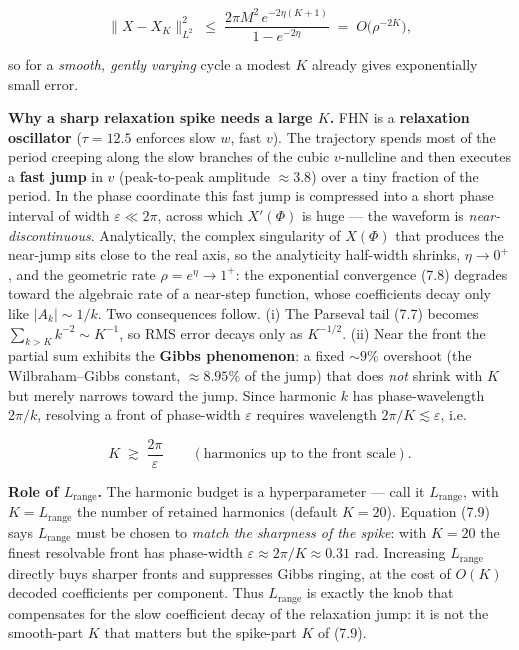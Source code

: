 \documentclass[
  11pt,
]{article}
\providecommand{\gt}{>}
\begin{document}
\[
\|X-X_K\|_{L^2}^2\;\le\;\frac{2\pi M^2\,e^{-2\eta(K+1)}}{1-e^{-2\eta}}\;=\;O\!\big(\rho^{-2K}\big), \tag{7.8}
\]

so for a \emph{smooth, gently varying} cycle a modest \(K\) already
gives exponentially small error.

\textbf{Why a sharp relaxation spike needs a large \(K\).} FHN is a
\textbf{relaxation oscillator} (\(\tau=12.5\) enforces slow \(w\), fast
\(v\)). The trajectory spends most of the period creeping along the slow
branches of the cubic \(v\)-nullcline and then executes a \textbf{fast
jump} in \(v\) (peak-to-peak amplitude \(\approx 3.8\)) over a tiny
fraction of the period. In the phase coordinate this fast jump is
compressed into a short phase interval of width \(\varepsilon\ll 2\pi\),
across which \(X'(\Phi)\) is huge --- the waveform is
\emph{near-discontinuous}. Analytically, the complex singularity of
\(X(\Phi)\) that produces the near-jump sits close to the real axis, so
the analyticity half-width shrinks, \(\eta\to 0^+\), and the geometric
rate \(\rho=e^\eta\to 1^+\): the exponential convergence (7.8) degrades
toward the algebraic rate of a near-step function, whose coefficients
decay only like \(|A_k|\sim 1/k\). Two consequences follow. (i) The
Parseval tail (7.7) becomes \(\sum_{k\gt K}k^{-2}\sim K^{-1}\), so RMS
error decays only as \(K^{-1/2}\). (ii) Near the front the partial sum
exhibits the \textbf{Gibbs phenomenon}: a fixed \(\sim 9\%\) overshoot
(the Wilbraham--Gibbs constant, \(\approx 8.95\%\) of the jump) that
does \emph{not} shrink with \(K\) but merely narrows toward the jump.
Since harmonic \(k\) has phase-wavelength \(2\pi/k\), resolving a front
of phase-width \(\varepsilon\) requires wavelength
\(2\pi/K\lesssim\varepsilon\), i.e.

\[
K\;\gtrsim\;\frac{2\pi}{\varepsilon}\qquad(\text{harmonics up to the front scale}). \tag{7.9}
\]

\textbf{Role of \(L_{\text{range}}\).} The harmonic budget is a
hyperparameter --- call it \(L_{\text{range}}\), with
\(K=L_{\text{range}}\) the number of retained harmonics (default
\(K=20\)). Equation (7.9) says \(L_{\text{range}}\) must be chosen to
\emph{match the sharpness of the spike}: with \(K=20\) the finest
resolvable front has phase-width
\(\varepsilon\approx 2\pi/K\approx0.31\) rad. Increasing
\(L_{\text{range}}\) directly buys sharper fronts and suppresses Gibbs
ringing, at the cost of \(O(K)\) decoded coefficients per component.
Thus \(L_{\text{range}}\) is exactly the knob that compensates for the
slow coefficient decay of the relaxation jump: it is not the smooth-part
\(K\) that matters but the spike-part \(K\) of (7.9).
\end{document}
